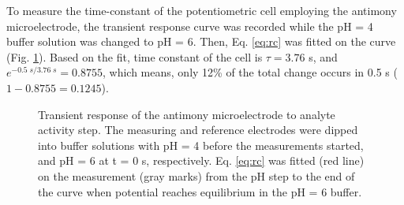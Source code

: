 To measure the time-constant of the potentiometric cell employing the antimony microelectrode, the transient response curve was recorded while the pH = 4 buffer solution was changed to pH = 6.
Then, Eq. \ref{eq:rc} was fitted on the curve (Fig. \ref{fig:transient}).
Based on the fit, time constant of the cell is $\tau = 3.76$ s, and $e^{-0.5 \; s/3.76 \; s} = 0.8755$, which means, only 12\% of the total change occurs in 0.5 s ($1 - 0.8755 = 0.1245$). 

\begin{figure}
\centering
{}
\caption[Transient response of the antimony microelectrode to analyte activity step.]{Transient response of the antimony microelectrode to analyte activity step.
The measuring and reference electrodes were dipped into buffer solutions with pH = 4 before the measurements started, and pH = 6 at t = 0 s, respectively.
Eq. \ref{eq:rc} was fitted (red line) on the measurement (gray marks) from the pH step to the end of the curve when potential reaches equilibrium in the pH = 6 buffer.}
\label{fig:transient}
\end{figure}


